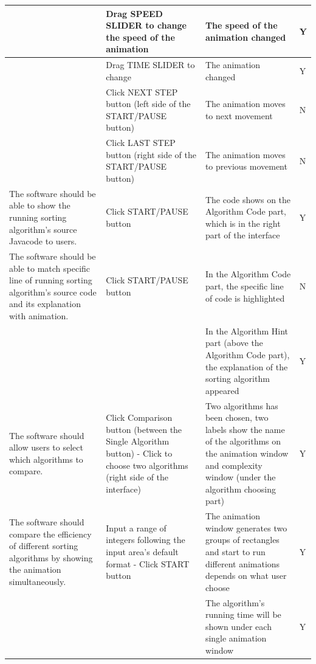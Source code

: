 \documentclass[paper=a4, fontsize=11pt,twoside]{scrartcl}		%
\begin{document}
\begin{table}[H]
\begin{tabular}{|p{4cm}|p{4cm}|p{5cm}|p{0.5cm}|}
\hline
 & Drag SPEED SLIDER to change the speed of the animation & The speed of the animation changed & Y \\ \hline
 & Drag TIME SLIDER to change & The animation changed & Y \\ \hline
 & Click NEXT STEP button (left side of the START/PAUSE button) & The animation moves to next movement & N \\ \hline
 & Click LAST STEP button (right side of the START/PAUSE button) & The animation moves to previous movement & N \\ \hline
The software should be able to show the running sorting algorithm's source Javacode to users. & Click START/PAUSE button & The code shows on the Algorithm Code part, which is in the right part of the interface & Y \\ \hline
The software should be able to match specific line of running sorting algorithm's source code and its explanation with animation. & Click START/PAUSE button & In the Algorithm Code part, the specific line of code is highlighted & N \\ \hline
 &  & In the Algorithm Hint part (above the Algorithm Code part), the explanation of the sorting algorithm appeared & Y \\ \hline
The software should allow users to select which algorithms to compare. & Click Comparison button (between the Single Algorithm button) - Click to choose two algorithms (right side of the interface) & Two algorithms has been chosen, two labels show the name of the algorithms on the animation window and complexity window (under the algorithm choosing part) & Y \\ \hline
The software should compare the efficiency of different sorting algorithms by showing the animation simultaneously. & Input a range of integers following the input area's default format - Click START button & The animation window generates two groups of rectangles and start to run different animations depends on what user choose & Y \\ \hline
 &  & The algorithm's running time will be shown under each single animation window & Y \\ \hline
\end{tabular}
\end{table}
 
\end{document}
